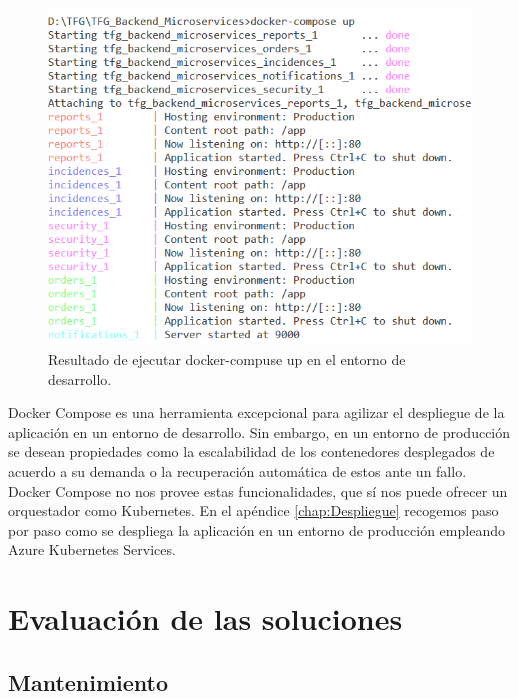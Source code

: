 \documentclass[11pt,spanish,listoffigures]{tfgetsinf}
\begin{document}
\begin{figure}[h]
\centering
\includegraphics[scale=0.8]{docker-compose-up}
\caption{Resultado de ejecutar docker-compuse up en el entorno de desarrollo.}
\end{figure}

Docker Compose es una herramienta excepcional para agilizar el despliegue de la aplicación en un entorno de desarrollo. Sin embargo, en un entorno de producción se desean propiedades como la escalabilidad de los contenedores desplegados de acuerdo a su demanda o la recuperación automática de estos ante un fallo. Docker Compose no nos provee estas funcionalidades, que sí nos puede ofrecer un orquestador como Kubernetes. En el apéndice \ref{chap:Despliegue}  recogemos paso por paso como se despliega la aplicación en un entorno de producción empleando Azure Kubernetes Services.

%

\chapter{Evaluación de las soluciones}

\section{Mantenimiento} \label{sect:Mantenimiento}
\end{document}
